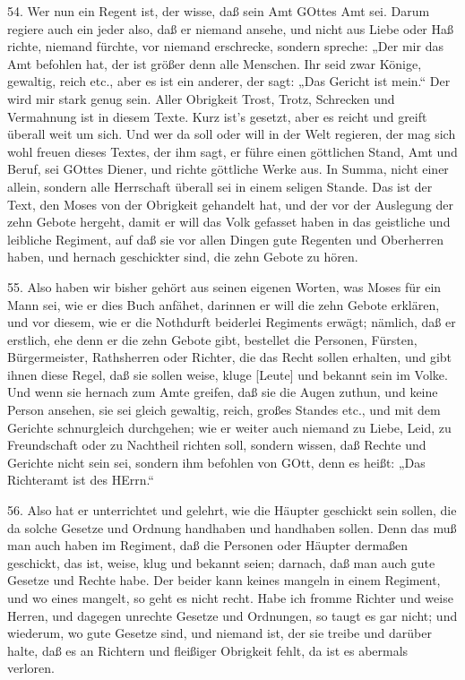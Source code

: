 54. Wer nun ein Regent ist, der wisse, daß sein Amt GOttes Amt sei. Darum regiere auch ein jeder also, daß er niemand ansehe, und nicht aus Liebe oder Haß richte, niemand fürchte, vor niemand erschrecke, sondern spreche: „Der mir das Amt befohlen hat, der ist größer denn alle Menschen. Ihr seid zwar Könige, gewaltig, reich etc., aber es ist ein anderer, der sagt: „Das Gericht ist mein.“ Der wird mir stark genug sein. Aller Obrigkeit Trost, Trotz, Schrecken und Vermahnung ist in diesem Texte. Kurz ist’s gesetzt, aber es reicht und greift überall weit um sich. Und wer da soll oder will in der Welt regieren, der mag sich wohl freuen dieses Textes, der ihm sagt, er führe einen göttlichen Stand, Amt und Beruf, sei GOttes Diener, und richte göttliche Werke aus. In Summa, nicht einer allein, sondern alle Herrschaft überall sei in einem seligen Stande. Das ist der Text, den Moses von der Obrigkeit gehandelt hat, und der vor der Auslegung der zehn Gebote hergeht, damit er will das Volk gefasset haben in das geistliche und leibliche Regiment, auf daß sie vor allen Dingen gute Regenten und Oberherren haben, und hernach geschickter sind, die zehn Gebote zu hören.

55. Also haben wir bisher gehört aus seinen eigenen Worten, was Moses für ein Mann sei, wie er dies Buch anfähet, darinnen er will die zehn Gebote erklären, und vor diesem, wie er die Nothdurft beiderlei Regiments erwägt; nämlich, daß er erstlich, ehe denn er die zehn Gebote gibt, bestellet die Personen, Fürsten, Bürgermeister, Rathsherren oder Richter, die das Recht sollen erhalten, und gibt ihnen diese Regel, daß sie sollen weise, kluge [Leute] und bekannt sein im Volke. Und wenn sie hernach zum Amte greifen, daß sie die Augen zuthun, und keine Person ansehen, sie sei gleich gewaltig, reich, großes Standes etc., und mit dem Gerichte schnurgleich durchgehen; wie er weiter auch niemand zu Liebe, Leid, zu Freundschaft oder zu Nachtheil richten soll, sondern wissen, daß Rechte und Gerichte nicht sein sei, sondern ihm befohlen von GOtt, denn es heißt: „Das Richteramt ist des HErrn.“

56. Also hat er unterrichtet und gelehrt, wie
die Häupter geschickt sein sollen, die da solche Gesetze und Ordnung handhaben und handhaben sollen. Denn das muß man auch haben im Regiment, daß die Personen oder Häupter dermaßen geschickt, das ist, weise, klug und bekannt seien; darnach, daß man auch gute Gesetze und Rechte habe. Der beider kann keines mangeln in einem Regiment, und wo eines mangelt, so geht es nicht recht. Habe ich fromme Richter und weise Herren, und dagegen unrechte Gesetze und Ordnungen, so taugt es gar nicht; und wiederum, wo gute Gesetze sind, und niemand ist, der sie treibe und darüber halte, daß es an Richtern und fleißiger Obrigkeit fehlt, da ist es abermals verloren.

